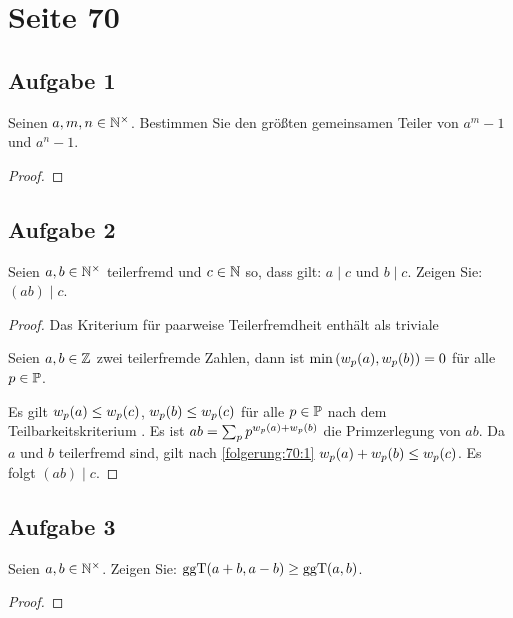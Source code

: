 \section{Seite 70}

\subsection{Aufgabe 1}
Seinen $a,m,n \in \mathbb{N}^\times{}$. Bestimmen Sie den größten gemeinsamen Teiler
von $a^m - 1$ und $a^n - 1$.
\begin{proof}
\end{proof}

\subsection{Aufgabe 2}
Seien $a,b \in \mathbb{N}^\times{}$ teilerfremd und $c \in \mathbb{N}{}$ so,
dass gilt: $a \mid c$ und $b \mid c$. Zeigen Sie: $(ab) \mid c$.
\begin{proof}
  Das Kriterium für paarweise Teilerfremdheit \parencite[50]{book:zahlentheorie}
  enthält als triviale
  \begin{folgerung}
    \label{folgerung:70:1}
    Seien $a,b \in \mathbb{Z}{}$ zwei teilerfremde Zahlen, dann ist
    $\min{(w_p(a), w_p(b))} = 0$
    für alle $p \in \mathbb{P}{}$.
  \end{folgerung}
  \noindent
  Es gilt $w_p(a) \leq w_p(c)$,
  $w_p(b) \leq w_p(c)$ für alle $p \in \mathbb{P}{}$
  nach dem Teilbarkeitskriterium \parencite[50]{book:zahlentheorie}.
  Es ist $ab = \sum_{p} p^{w_p(a) + w_p(b)}$
  die Primzerlegung von $ab$. Da $a$ und $b$ teilerfremd sind, gilt nach
  \autoref{folgerung:70:1} $w_p(a) + w_p(b)
    \leq w_p(c)$. Es folgt $(ab) \mid c$.
\end{proof}

\subsection{Aufgabe 3}
Seien $a,b \in \mathbb{N}^\times{}$. Zeigen Sie: $\text{ggT}(a + b,a - b) \geq \text{ggT}(a,b)$.
\begin{proof}
\end{proof}

